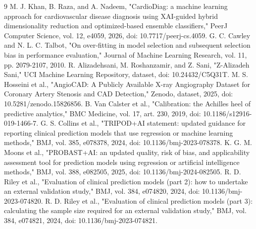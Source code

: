 \documentclass[conference]{IEEEtran}
\begin{document}
\newpage
\begin{thebibliography}{9}
 M. J. Khan, B. Raza, and A. Nadeem, "CardioDiag: a machine learning approach for cardiovascular disease diagnosis using XAI-guided hybrid dimensionality reduction and optimized-based ensemble classifiers," PeerJ Computer Science, vol. 12, e4059, 2026, doi: 10.7717/peerj-cs.4059.
 G. C. Cawley and N. L. C. Talbot, "On over-fitting in model selection and subsequent selection bias in performance evaluation," Journal of Machine Learning Research, vol. 11, pp. 2079-2107, 2010.
 R. Alizadehsani, M. Roshanzamir, and Z. Sani, "Z-Alizadeh Sani," UCI Machine Learning Repository, dataset, doi: 10.24432/C5Q31T.
 M. S. Hosseini et al., "AngioCAD: A Publicly Available X-ray Angiography Dataset for Coronary Artery Stenosis and CAD Detection," Zenodo, dataset, 2025, doi: 10.5281/zenodo.15826856.
 B. Van Calster et al., "Calibration: the Achilles heel of predictive analytics," BMC Medicine, vol. 17, art. 230, 2019, doi: 10.1186/s12916-019-1466-7.
 G. S. Collins et al., "TRIPOD+AI statement: updated guidance for reporting clinical prediction models that use regression or machine learning methods," BMJ, vol. 385, e078378, 2024, doi: 10.1136/bmj-2023-078378.
 K. G. M. Moons et al., "PROBAST+AI: an updated quality, risk of bias, and applicability assessment tool for prediction models using regression or artificial intelligence methods," BMJ, vol. 388, e082505, 2025, doi: 10.1136/bmj-2024-082505.
 R. D. Riley et al., "Evaluation of clinical prediction models (part 2): how to undertake an external validation study," BMJ, vol. 384, e074820, 2024, doi: 10.1136/bmj-2023-074820.
 R. D. Riley et al., "Evaluation of clinical prediction models (part 3): calculating the sample size required for an external validation study," BMJ, vol. 384, e074821, 2024, doi: 10.1136/bmj-2023-074821.
\end{thebibliography}
\end{document}

